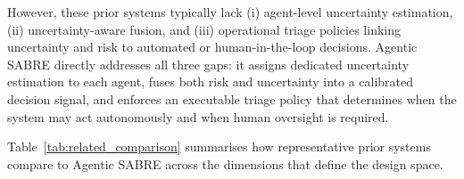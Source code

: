 \documentclass[lettersize,journal]{IEEEtran}
\begin{document}
However, these prior systems typically lack (i) agent-level uncertainty
estimation, (ii) uncertainty-aware fusion, and (iii) operational triage policies linking uncertainty and risk to automated or human-in-the-loop decisions. Agentic SABRE directly addresses all three gaps: it assigns dedicated uncertainty estimation to each agent, fuses both risk and uncertainty into a calibrated decision signal, and enforces an executable triage policy that determines when the system may act autonomously and when human oversight is required.


\cbstart
Table~\ref{tab:related_comparison} summarises how representative prior systems compare to
Agentic SABRE across the dimensions that define the design space.

\begin{table}[t]
\centering
\caption{Comparison of Agentic SABRE with representative prior ransomware and intrusion
detection systems across key design dimensions. \checkmark~= present; $\circ$~= partial;
$\times$~= absent.}
\label{tab:related_comparison}

\cbend
\end{table}
\end{document}
